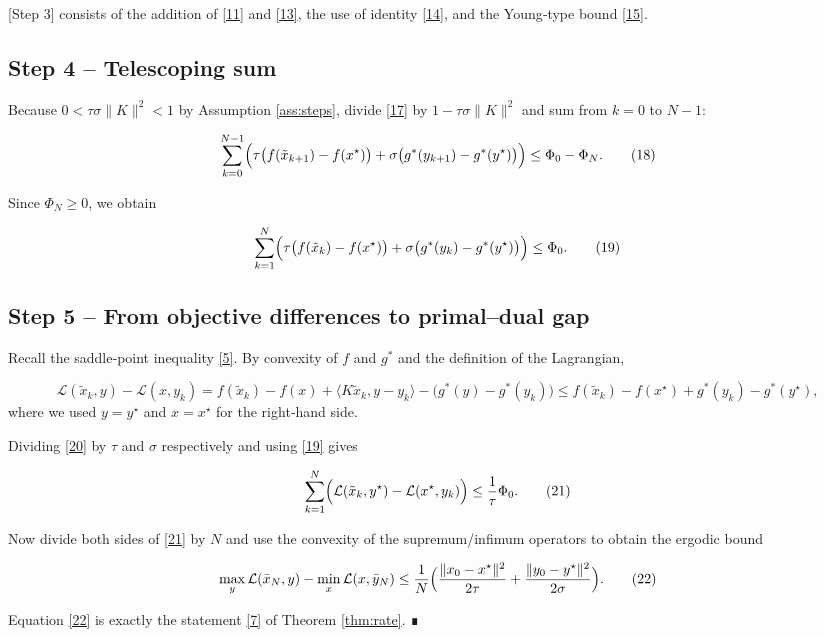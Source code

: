 \documentclass{article}
\begin{document}
[Step 3] consists of the addition of \eqref{11} and \eqref{13}, the use of identity \eqref{14}, and the Young‑type bound \eqref{15}.

\subsection*{Step 4 – Telescoping sum}
Because $0<\tau\sigma\|K\|^{2}<1$ by Assumption \ref{ass:steps}, divide \eqref{17} by $1-\tau\sigma\|K\|^{2}$ and sum from $k=0$ to $N-1$:

\[
\sum_{k=0}^{N-1}\Bigl(
   \tau\bigl(f(\tilde x_{k+1})-f(x^{\star})\bigr)
   +\sigma\bigl(g^{*}(y_{k+1})-g^{*}(y^{\star})\bigr)\Bigr)
\le \Phi_{0}-\Phi_{N}.
\tag{18}
\]

Since $\Phi_{N}\ge0$, we obtain  

\[
\sum_{k=1}^{N}\Bigl(
   \tau\bigl(f(\tilde x_{k})-f(x^{\star})\bigr)
   +\sigma\bigl(g^{*}(y_{k})-g^{*}(y^{\star})\bigr)\Bigr)
\le \Phi_{0}.
\tag{19}
\]

\subsection*{Step 5 – From objective differences to primal–dual gap}
Recall the saddle‑point inequality \eqref{5}. By convexity of $f$ and $g^{*}$ and the definition of the Lagrangian,  

\[
\mathcal L(\tilde x_{k},y)-\mathcal L(x,y_{k})
   = f(\tilde x_{k})-f(x)+\langle K\tilde x_{k},y-y_{k}\rangle
     -\bigl(g^{*}(y)-g^{*}(y_{k})\bigr)
\le f(\tilde x_{k})-f(x^{\star})
    +g^{*}(y_{k})-g^{*}(y^{\star}),
\tag{20}
\]
where we used $y=y^{\star}$ and $x=x^{\star}$ for the right‑hand side.  

Dividing \eqref{20} by $\tau$ and $\sigma$ respectively and using \eqref{19} gives  

\[
\sum_{k=1}^{N}\Bigl(\mathcal L(\tilde x_{k},y^{\star})-\mathcal L(x^{\star},y_{k})\Bigr)
\le \frac{1}{\tau}\Phi_{0}.
\tag{21}
\]

Now divide both sides of \eqref{21} by $N$ and use the convexity of the supremum/infimum operators to obtain the ergodic bound  

\[
\max_{y}\mathcal L(\bar x_{N},y)-\min_{x}\mathcal L(x,\bar y_{N})
   \le \frac{1}{N}\Bigl(\frac{\|x_{0}-x^{\star}\|^{2}}{2\tau}
                     +\frac{\|y_{0}-y^{\star}\|^{2}}{2\sigma}\Bigr).
\tag{22}
\]

Equation \eqref{22} is exactly the statement \eqref{7} of Theorem \ref{thm:rate}. ∎
\end{document}
